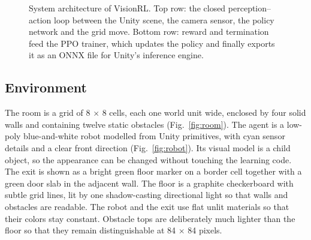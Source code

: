 \documentclass[conference]{IEEEtran}
\begin{document}
\begin{figure}[!t]
\centering
{}
\caption{System architecture of VisionRL. Top row: the closed perception--action loop between the Unity scene, the camera sensor, the policy network and the grid move. Bottom row: reward and termination feed the PPO trainer, which updates the policy and finally exports it as an ONNX file for Unity's inference engine.}
\label{fig:arch}
\end{figure}


\subsection{Environment}
The room is a grid of 8 $\times$ 8 cells, each one world unit wide, enclosed by four solid walls and containing twelve static obstacles (Fig.~\ref{fig:room}). The agent is a low-poly blue-and-white robot modelled from Unity primitives, with cyan sensor details and a clear front direction (Fig.~\ref{fig:robot}). Its visual model is a child object, so the appearance can be changed without touching the learning code. The exit is shown as a bright green floor marker on a border cell together with a green door slab in the adjacent wall. The floor is a graphite checkerboard with subtle grid lines, lit by one shadow-casting directional light so that walls and obstacles are readable. The robot and the exit use flat unlit materials so that their colors stay constant. Obstacle tops are deliberately much lighter than the floor so that they remain distinguishable at 84 $\times$ 84 pixels.
\end{document}
